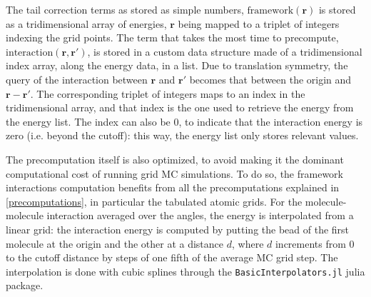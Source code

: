 \documentclass[main.tex]{subfiles}
\begin{document}
The tail correction terms as stored as simple numbers, $\text{framework}(\boldsymbol r)$ is stored as a tridimensional array of energies, $\boldsymbol r$ being mapped to a triplet of integers indexing the grid points. The term that takes the most time to precompute, $\text{interaction}(\boldsymbol r, \boldsymbol r')$, is stored in a custom data structure made of a tridimensional index array, along the energy data, in a list. Due to translation symmetry, the query of the interaction between $\boldsymbol r$ and $\boldsymbol r'$ becomes that between the origin and $\boldsymbol r - \boldsymbol r'$. The corresponding triplet of integers maps to an index in the tridimensional array, and that index is the one used to retrieve the energy from the energy list. The index can also be 0, to indicate that the interaction energy is zero (i.e. beyond the cutoff): this way, the energy list only stores relevant values.

The precomputation itself is also optimized, to avoid making it the dominant computational cost of running grid MC simulations. To do so, the framework interactions computation benefits from all the precomputations explained in \cref{precomputations}, in particular the tabulated atomic grids. For the molecule-molecule interaction averaged over the angles, the energy is interpolated from a linear grid: the interaction energy is computed by putting the bead of the first molecule at the origin and the other at a distance $d$, where $d$ increments from 0 to the cutoff distance by steps of one fifth of the average MC grid step. The interpolation is done with cubic splines through the \texttt{BasicInterpolators.jl} julia package.
\end{document}

